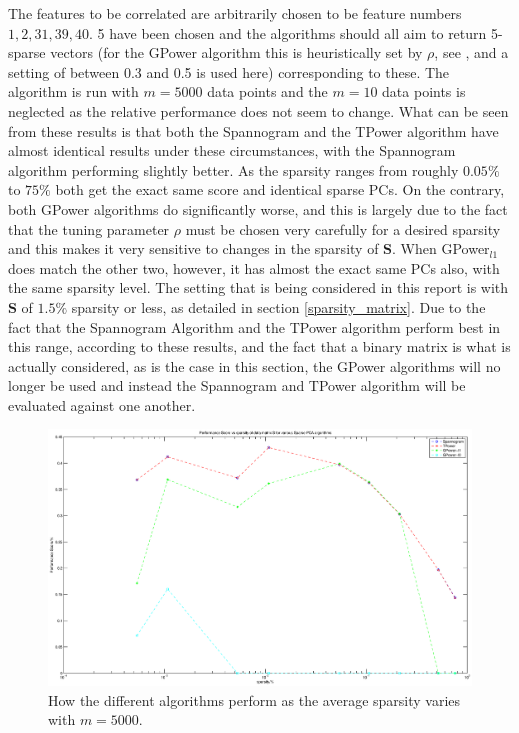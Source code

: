 \documentclass[11pt,a4paper]{article}
\newcommand{\smat}{\mathbf{S}}
\begin{document}
The features to be correlated are arbitrarily chosen to be feature numbers $1, 2, 31, 39, 40$. 5 have been chosen and the algorithms should all aim to return 5-sparse vectors (for the GPower algorithm this is heuristically set by $\rho$, see \cite{GPower}, and a setting of between 0.3 and 0.5 is used here) corresponding to these. The algorithm is run with $m = 5000$ data points and the $m = 10$ data points is neglected as the relative performance does not seem to change. What can be seen from these results is that both the Spannogram and the TPower algorithm have almost identical results under these circumstances, with the Spannogram algorithm performing slightly better. As the sparsity ranges from roughly $0.05\%$ to $75\%$ both get the exact same score and identical sparse PCs. On the contrary, both GPower algorithms do significantly worse, and this is largely due to the fact that the tuning parameter $\rho$ must be chosen very carefully for a desired sparsity and this makes it very sensitive to changes in the sparsity of $\smat$. When GPower$_{l1}$ does match the other two, however, it has almost the exact same PCs also, with the same sparsity level. The setting that is being considered in this report is with $\smat$ of $1.5\%$ sparsity or less, as detailed in section \ref{sparsity_matrix}. Due to the fact that the Spannogram Algorithm and the TPower algorithm perform best in this range, according to these results, and the fact that a binary matrix is what is actually considered, as is the case in this section, the GPower algorithms will no longer be used and instead the Spannogram and TPower algorithm will be evaluated against one another. 



\begin{figure}[H]
\centering
\includegraphics[scale=0.3]{performance_vs_sparsity_5000.eps}
\caption{How the different algorithms perform as the average sparsity varies with $m = 5000$.}
\label{perf_score_binary_matrix}
\end{figure}
\end{document}
